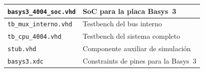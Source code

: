 \documentclass[%
    school=etsisi,%
    type=pfg,%
    degree=61CI,%
]{upm-report}
\begin{document}
\begin{table}[H]
\begin{tabularx}{\textwidth}{@{}lX@{}}
\texttt{basys3\_4004\_soc.vhd}     & SoC para la placa Basys~3 \\
\midrule
\texttt{tb\_mux\_interno.vhd}      & Testbench del bus interno \\
\texttt{tb\_cpu\_4004.vhd}         & Testbench del sistema completo \\
\texttt{stub.vhd}                  & Componente auxiliar de simulación \\
\midrule
\texttt{basys3.xdc}                & Constraints de pines para la Basys~3 \\
\bottomrule
\end{tabularx}
\end{table}
\end{document}

